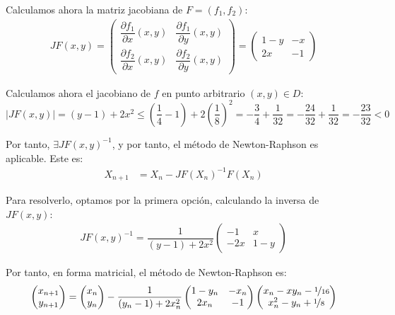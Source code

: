 \begin{ejercicio}
\begin{enumerate}
        Calculamos ahora la matriz jacobiana de $F=(f_1,f_2)$:
        \begin{align*}
            JF(x,y)=\begin{pmatrix}
                \dfrac{\partial f_1}{\partial x}(x,y) & \dfrac{\partial f_1}{\partial y}(x,y)\\
                \dfrac{\partial f_2}{\partial x}(x,y) & \dfrac{\partial f_2}{\partial y}(x,y)
            \end{pmatrix}=\begin{pmatrix}
                1-y & -x\\
                2x & -1
            \end{pmatrix}
        \end{align*}

        Calculamos ahora el jacobiano de $f$ en punto arbitrario $(x,y)\in D$:
        \begin{equation*}
            |JF(x,y)|=(y-1)+2x^2\leq \left(\frac{1}{4}-1\right)+2\left(\frac{1}{8}\right)^2=-\frac{3}{4}+\frac{1}{32}=-\frac{24}{32}+\frac{1}{32}=-\frac{23}{32}<0
        \end{equation*}

        Por tanto, $\exists JF(x,y)^{-1}$, y por tanto, el método de Newton-Raphson es aplicable.
        Este es:
        \begin{align*}
            X_{n+1}&=X_n-JF(X_n)^{-1}F(X_n)
        \end{align*}

        Para resolverlo, optamos por la primera opción, calculando la inversa de $JF(x,y)$:
        \begin{align*}
            JF(x,y)^{-1}=\dfrac{1}{(y-1)+2x^2}\begin{pmatrix}
                -1 & x\\
                -2x & 1-y
            \end{pmatrix}
        \end{align*}

        Por tanto, en forma matricial, el método de Newton-Raphson es:
        \begin{align*}
            \begin{pmatrix}
                x_{n+1}\\
                y_{n+1}
            \end{pmatrix}=\begin{pmatrix}
                x_n\\
                y_n
            \end{pmatrix}-\dfrac{1}{(y_n-1)+2x_n^2}\begin{pmatrix}
                1-y_n & -x_n\\
                2x_n & -1
            \end{pmatrix}\begin{pmatrix}
                x_n-xy_n-\nicefrac{1}{16}\\
                x_n^2-y_n+\nicefrac{1}{8}
            \end{pmatrix}
        \end{align*}


\end{enumerate}
\end{ejercicio}
